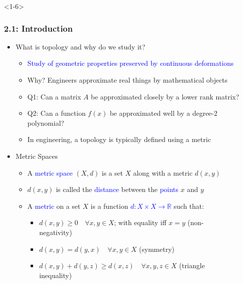 \documentclass[10pt,english,aspectratio=169]{beamer}
\begin{document}
\begin{frame}<1-6> \frametitle{2.1: Introduction}

\begin{itemize}
\setlength\itemsep{3mm}
\item<1-> What is topology and why do we study it? \vspace{1mm}
\begin{itemize} 
  \setlength\itemsep{1.5mm}
  \item<1-> \textcolor{blue}{Study of geometric properties preserved by continuous deformations}
  \item<2-> Why? Engineers approximate real things by mathematical objects
  \item<2-> Q1: Can a matrix $A$ be approximated closely by a lower rank matrix?
  \item<2-> Q2: Can a function $f(x)$ be approximated well by a degree-2 polynomial?
  \item<3-> In engineering, a topology is typically defined using a metric
\end{itemize}

\vspace{1mm}

\item<4-> Metric Spaces \vspace{1mm}
\begin{itemize} 
  \setlength\itemsep{1.5mm}
  \item<4-> A \textcolor{blue}{metric space} $(X,d)$ is a set $X$ along with a metric $d(x,y)\!\!$
  \item<4-> $d(x,y)$ is called the \textcolor{blue}{distance} between the \textcolor{blue}{points} $x$ and $y$
  \item<5-> A \textcolor{blue}{metric} on a set $X$ is a function \textcolor{blue}{$d \colon X \times X \rightarrow \mathbb{R} $} such that: \vspace{1mm}
  \begin{itemize}
  \setlength\itemsep{1.5mm}
  \item<5->[1.] $d(x,y) \geq 0 \quad \forall x, y \in X$; with equality iff $x = y$ \hfill (non-negativity)~~~~~~~~~
  \item<5->[2.] $d(x,y) = d(y,x) \quad \forall x, y \in X$ \hfill (symmetry)~~~~~~~~~
  \item<6->[3.] $d(x,y) + d(y,z) \geq d(x,z) \quad \forall x, y, z \in X$ \hfill (triangle inequality)~~~~~~~~~
  \end{itemize}
\end{itemize}
\end{itemize}


\end{frame}
\end{document}
